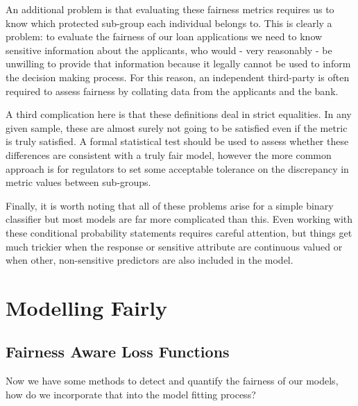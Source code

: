 \documentclass[
  12pt,
]{book}
\begin{document}
An additional problem is that evaluating these fairness metrics requires us to know which protected sub-group each individual belongs to. This is clearly a problem: to evaluate the fairness of our loan applications we need to know sensitive information about the applicants, who would - very reasonably - be unwilling to provide that information because it legally cannot be used to inform the decision making process. For this reason, an independent third-party is often required to assess fairness by collating data from the applicants and the bank.

A third complication here is that these definitions deal in strict equalities. In any given sample, these are almost surely not going to be satisfied even if the metric is truly satisfied. A formal statistical test should be used to assess whether these differences are consistent with a truly fair model, however the more common approach is for regulators to set some acceptable tolerance on the discrepancy in metric values between sub-groups.

Finally, it is worth noting that all of these problems arise for a simple binary classifier but most models are far more complicated than this. Even working with these conditional probability statements requires careful attention, but things get much trickier when the response or sensitive attribute are continuous valued or when other, non-sensitive predictors are also included in the model.

\hypertarget{modelling-fairly}{%
\section{Modelling Fairly}\label{modelling-fairly}}

\hypertarget{fairness-aware-loss-functions}{%
\subsection{Fairness Aware Loss Functions}\label{fairness-aware-loss-functions}}

Now we have some methods to detect and quantify the fairness of our models, how do we incorporate that into the model fitting process?
\end{document}
